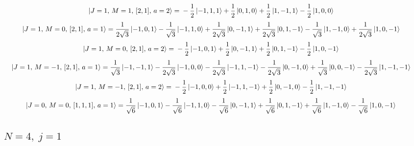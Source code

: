 \documentclass{article}
\begin{document}
\begin{equation*}
\begin{aligned}
\ket{J=1,\,M=1,\,[2,1],\,a=2} = \; &- \frac{1}{2} \ket{-1,1,1} + \frac{1}{2} \ket{0,1,0} + \frac{1}{2} \ket{1,-1,1} - \frac{1}{2} \ket{1,0,0}
\end{aligned}
\end{equation*}
\begin{equation*}
\begin{aligned}
\ket{J=1,\,M=0,\,[2,1],\,a=1} = \; &\frac{1}{2\sqrt{3}} \ket{-1,0,1} - \frac{1}{\sqrt{3}} \ket{-1,1,0} + \frac{1}{2\sqrt{3}} \ket{0,-1,1} + \frac{1}{2\sqrt{3}} \ket{0,1,-1} - \frac{1}{\sqrt{3}} \ket{1,-1,0} + \frac{1}{2\sqrt{3}} \ket{1,0,-1}
\end{aligned}
\end{equation*}
\begin{equation*}
\begin{aligned}
\ket{J=1,\,M=0,\,[2,1],\,a=2} = \; &- \frac{1}{2} \ket{-1,0,1} + \frac{1}{2} \ket{0,-1,1} + \frac{1}{2} \ket{0,1,-1} - \frac{1}{2} \ket{1,0,-1}
\end{aligned}
\end{equation*}
\begin{equation*}
\begin{aligned}
\ket{J=1,\,M=-1,\,[2,1],\,a=1} = \; &\frac{1}{\sqrt{3}} \ket{-1,-1,1} - \frac{1}{2\sqrt{3}} \ket{-1,0,0} - \frac{1}{2\sqrt{3}} \ket{-1,1,-1} - \frac{1}{2\sqrt{3}} \ket{0,-1,0} + \frac{1}{\sqrt{3}} \ket{0,0,-1} - \frac{1}{2\sqrt{3}} \ket{1,-1,-1}
\end{aligned}
\end{equation*}
\begin{equation*}
\begin{aligned}
\ket{J=1,\,M=-1,\,[2,1],\,a=2} = \; &- \frac{1}{2} \ket{-1,0,0} + \frac{1}{2} \ket{-1,1,-1} + \frac{1}{2} \ket{0,-1,0} - \frac{1}{2} \ket{1,-1,-1}
\end{aligned}
\end{equation*}
\begin{equation*}
\begin{aligned}
\ket{J=0,\,M=0,\,[1,1,1],\,a=1} = \; &\frac{1}{\sqrt{6}} \ket{-1,0,1} - \frac{1}{\sqrt{6}} \ket{-1,1,0} - \frac{1}{\sqrt{6}} \ket{0,-1,1} + \frac{1}{\sqrt{6}} \ket{0,1,-1} + \frac{1}{\sqrt{6}} \ket{1,-1,0} - \frac{1}{\sqrt{6}} \ket{1,0,-1}
\end{aligned}
\end{equation*}
\subsection*{$N=4,\; j=1$}
\end{document}
